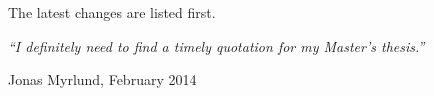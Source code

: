 \documentclass[11pt, a4paper, oneside]{Thesis} %
\begin{document}



\clearpage %


\changelog

The latest changes are listed first.

\begin{description}
  
\end{description}

\clearpage


\pagestyle{empty} %

\null\vfill %

\textit{\Large{``I definitely need to find a timely quotation for my Master's thesis.''}}

\begin{flushright}
Jonas Myrlund, February 2014
\end{flushright}

\vfill\vfill\vfill\vfill\vfill\vfill\null %

\clearpage %


\end{document}
